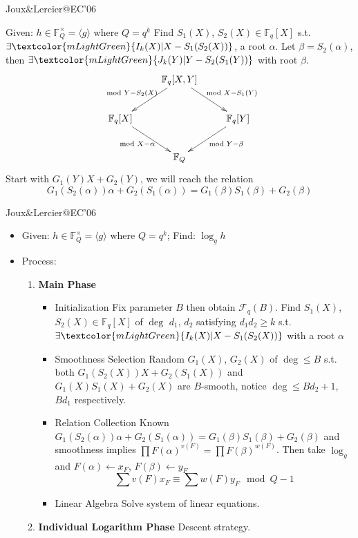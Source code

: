 \documentclass{beamer}
\begin{document}
		\begin{frame}{Joux\&Lercier@EC'06}
			\begin{block}{Given: $h\in\mathbb{F}_Q^\times =\langle g\rangle$ where $Q = q^k$}
			Find $S_1(X)$, $S_2(X)\in\mathbb{F}_q[X]$ s.t. $\exists \textcolor{mLightGreen}{I_k(X)|X - S_1(S_2(X))}$, a root $\alpha$.
			Let $\beta = S_2(\alpha)$, then $\exists\textcolor{mLightGreen}{J_k(Y)|Y-S_2(S_1(Y))}$ with root $\beta$.
			\pause
			$$\xymatrix{
				& \mathbb{F}_q[X, Y] \ar[dl]_{\mod Y - S_2(X)} \ar[dr]^{\mod X - S_1(Y)} & \\
				\mathbb{F}_q[X] \ar[dr]_{\mod X - \alpha} & & \mathbb{F}_q[Y] \ar[dl]^{\mod Y - \beta} \\
				& \mathbb{F}_Q & 
			}$$
			\pause
			Start with $G_1(Y)X+G_2(Y)$, we will reach the relation
			$$G_1(S_2(\alpha))\alpha+G_2(S_1(\alpha)) = G_1(\beta)S_1(\beta)+G_2(\beta)$$
			\end{block}
		\end{frame}
		\begin{frame}{Joux\&Lercier@EC'06}
			\begin{itemize}
				\item
					Given: $h\in\mathbb{F}_Q^\times = \langle g\rangle$ where $Q = q^k$; Find: $\log_g h$
				\item
					Process:
					\begin{enumerate}
						\item
							\textbf{Main Phase}
						\begin{itemize}
							\item
								\alert{Initialization} 
								Fix parameter $B$ then obtain $\mathcal{F}_q(B)$. 
								Find $S_1(X)$, $S_2(X)\in\mathbb{F}_q[X]$ of $\deg$ $d_1$, $d_2$ 
								satisfying $d_1d_2\geq k$ s.t. 
								$\exists \textcolor{mLightGreen}{I_k(X)|X - S_1(S_2(X))}$ 
								with a root $\alpha$
							\item
								\alert{Smoothness Selection} 
								Random $G_1(X)$, $G_2(X)$ of $\deg\leq B$ s.t. 
								both $G_1(S_2(X))X+G_2(S_1(X))$ and $G_1(X)S_1(X)+G_2(X)$ are $B$-smooth, 
								notice $\deg\leq B d_2 + 1$, $B d_1$ respectively.
							\item
								\alert{Relation Collection} Known
								$G_1(S_2(\alpha))\alpha+G_2(S_1(\alpha)) = G_1(\beta)S_1(\beta)+G_2(\beta)$
								and smoothness implies 
								$\prod F(\alpha)^{v(F)} = \prod F(\beta)^{w(F)}$.
								Then take $\log_g$ and $F(\alpha)\leftarrow x_F$, $F(\beta)\leftarrow y_F$
								$$\sum v(F) x_F \equiv \sum w(F) y_F \mod Q-1$$
							\item
								\alert{Linear Algebra} Solve system of linear equations.
						\end{itemize}
						\item
							\textbf{Individual Logarithm Phase} Descent strategy.
					\end{enumerate}
			\end{itemize}
		\end{frame}
\end{document}

